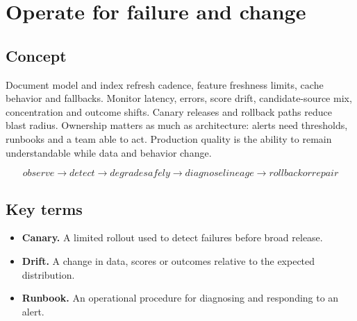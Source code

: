 \section{Operate for failure and change}

\begin{abstract}
A good design explains refresh, observability, degradation and rollback before launch.
\end{abstract}

\subsection{Concept}
Document model and index refresh cadence, feature freshness limits, cache behavior and fallbacks. Monitor latency, errors, score drift, candidate-source mix, concentration and outcome shifts. Canary releases and rollback paths reduce blast radius. Ownership matters as much as architecture: alerts need thresholds, runbooks and a team able to act. Production quality is the ability to remain understandable while data and behavior change.

\begin{equation*}
observe \rightarrow detect \rightarrow degrade safely \rightarrow diagnose lineage \rightarrow rollback or repair
\end{equation*}

\subsection{Key terms}
\begin{itemize}
\item \textbf{Canary.} A limited rollout used to detect failures before broad release.
\item \textbf{Drift.} A change in data, scores or outcomes relative to the expected distribution.
\item \textbf{Runbook.} An operational procedure for diagnosing and responding to an alert.
\end{itemize}
